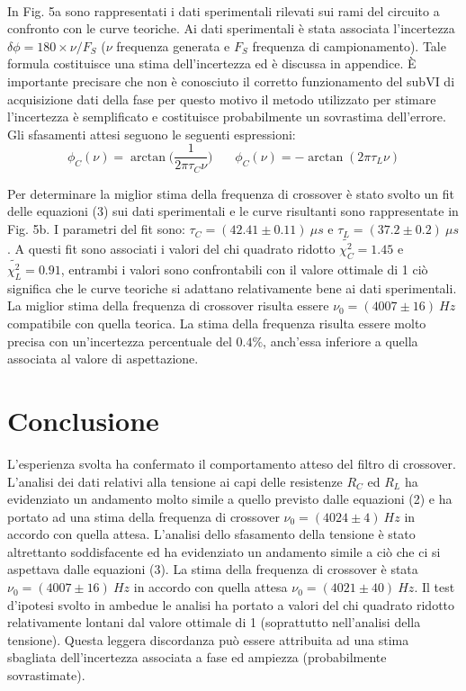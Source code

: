 \documentclass[12pt]{article}
\begin{document}
\
\\
In Fig. 5a sono rappresentati i dati sperimentali rilevati sui rami del circuito
a confronto con le curve teoriche. Ai dati sperimentali è stata associata l'incertezza 
$\delta \phi = 180 \times \nu / F_S $ ($\nu$ frequenza generata e $F_S$ frequenza di campionamento). Tale formula
costituisce una stima dell'incertezza ed è discussa in appendice. È importante precisare che 
non è conosciuto il corretto funzionamento del subVI di acquisizione dati della fase per questo motivo il metodo 
utilizzato per stimare l'incertezza è semplificato e costituisce probabilmente un sovrastima dell'errore.
Gli sfasamenti attesi seguono le seguenti espressioni:
\begin{equation}
  \phi_C(\nu) = \arctan\bigg(\frac{1}{2\pi\tau_C\nu}\bigg) \ \ \ \ \ \ \ \ \phi_C(\nu) = -\arctan(2\pi\tau_L\nu)
\end{equation}

Per determinare la miglior stima della frequenza di crossover è stato svolto un fit delle equazioni (3) sui dati sperimentali e le curve 
risultanti sono rappresentate in Fig. 5b. I parametri del fit sono:
$\tau_C=(42.41 \pm 0.11) \ \mu s$ e $\tau_L=(37.2 \pm 0.2) \ \mu s$. A questi fit sono associati i valori del chi quadrato ridotto
$\tilde{\chi^2_C}=1.45$ e $\tilde{\chi^2_L}=0.91$, entrambi i valori sono confrontabili con il valore ottimale di 1 ciò significa che 
le curve teoriche si adattano relativamente bene ai dati sperimentali.
La miglior stima della frequenza di crossover risulta essere $\nu_0 = (4007 \pm 16) \ Hz$ compatibile con quella teorica.
La stima della frequenza risulta essere molto precisa con un'incertezza percentuale del $0.4\%$, anch'essa inferiore a quella associata al valore di aspettazione.

\section{Conclusione}
L'esperienza svolta ha confermato il comportamento atteso del filtro di crossover. L'analisi dei dati relativi alla tensione 
ai capi delle resistenze $R_C$ ed $R_L$ ha evidenziato un andamento molto simile a quello previsto dalle equazioni (2) e ha portato 
ad una stima della frequenza di crossover $\nu_0 = (4024 \pm 4) \ Hz$ in accordo con quella attesa. L'analisi dello sfasamento della tensione è stato 
altrettanto soddisfacente ed ha evidenziato un andamento simile a ciò che ci si aspettava dalle equazioni (3). La stima della 
frequenza di crossover è stata $\nu_0 = (4007 \pm 16) \ Hz$ in accordo con quella attesa $\nu_0 = (4021 \pm 40) \ Hz$. Il test d'ipotesi svolto 
in ambedue le analisi ha portato a valori del chi quadrato ridotto relativamente lontani dal valore ottimale di 1 (soprattutto nell'analisi della tensione). Questa leggera discordanza 
può essere attribuita ad una stima sbagliata dell'incertezza associata a fase ed ampiezza (probabilmente sovrastimate).
\end{document}
